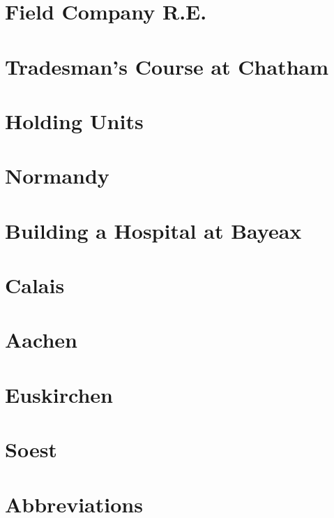 \documentclass{book}
\begin{document}


\chapter{Field Company R.E.}



\chapter{Tradesman's Course at Chatham}



\chapter{Holding Units}



\chapter{Normandy}



\chapter{Building a Hospital at Bayeax}



\chapter{Calais}



\chapter{Aachen}



\chapter{Euskirchen}



\chapter{Soest}



\appendix

\chapter{Abbreviations}


\end{document}
